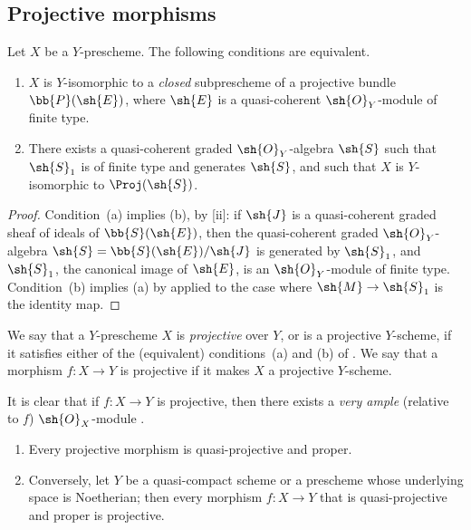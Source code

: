 \subsection{Projective morphisms}
\label{subsection:II.5.5}

\begin{proposition}[5.5.1]
\label{II.5.5.1}
Let $X$ be a $Y$-prescheme.
The following conditions are equivalent.
\begin{enumerate}
  \item[{\rm(a)}] $X$ is $Y$-isomorphic to a \emph{closed} subprescheme of a projective bundle $\bb{P}(\sh{E})$, where $\sh{E}$ is a quasi-coherent $\sh{O}_Y$-module of finite type.
  \item[{\rm(b)}] There exists a quasi-coherent graded $\sh{O}_Y$-algebra $\sh{S}$ such that $\sh{S}_1$ is of finite type and generates $\sh{S}$, and such that $X$ is $Y$-isomorphic to $\Proj(\sh{S})$.
\end{enumerate}
\end{proposition}

\begin{proof}
Condition~(a) implies (b), by [ii]: if $\sh{J}$ is a quasi-coherent graded sheaf of ideals of $\bb{S}(\sh{E})$, then the quasi-coherent graded $\sh{O}_Y$-algebra $\sh{S}=\bb{S}(\sh{E})/\sh{J}$ is generated by $\sh{S}_1$, and $\sh{S}_1$, the canonical image of $\sh{E}$, is an $\sh{O}_Y$-module of finite type.
Condition~(b) implies (a) by  applied to the case where $\sh{M}\to\sh{S}_1$ is the identity map.
\end{proof}

\begin{definition}[5.5.2]
\label{II.5.5.2}
We say that a $Y$-prescheme $X$ is \emph{projective} over $Y$, or is a projective $Y$-scheme, if it satisfies either of the (equivalent) conditions~(a) and (b) of .
We say that a morphism $f:X\to Y$ is projective if it makes $X$ a projective $Y$-scheme.
\end{definition}

It is clear that if $f:X\to Y$ is projective, then there exists a \emph{very ample} (relative to $f$) $\sh{O}_X$-module .
\begin{theorem}[5.5.3]
\label{II.5.5.3}
\medskip\noindent
\begin{enumerate}
  \item[{\rm(i)}] Every projective morphism is quasi-projective and proper.
  \item[{\rm(ii)}] Conversely, let $Y$ be a quasi-compact scheme or a prescheme whose underlying space is Noetherian; then every morphism $f:X\to Y$ that is quasi-projective and proper is projective.
\end{enumerate}
\end{theorem}

